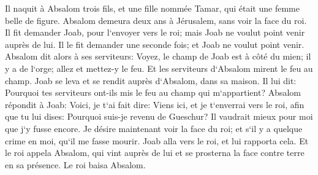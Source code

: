 \verse Il naquit à Absalom trois fils, et une fille nommée Tamar, qui était une femme belle de figure. 
\verse Absalom demeura deux ans à Jérusalem, sans voir la face du roi. 
\verse Il fit demander Joab, pour l`envoyer vers le roi; mais Joab ne voulut point venir auprès de lui. Il le fit demander une seconde fois; et Joab ne voulut point venir. 
\verse Absalom dit alors à ses serviteurs: Voyez, le champ de Joab est à côté du mien; il y a de l`orge; allez et mettez-y le feu. Et les serviteurs d`Absalom mirent le feu au champ. 
\verse Joab se leva et se rendit auprès d`Absalom, dans sa maison. Il lui dit: Pourquoi tes serviteurs ont-ils mis le feu au champ qui m`appartient? 
\verse Absalom répondit à Joab: Voici, je t`ai fait dire: Viens ici, et je t`enverrai vers le roi, afin que tu lui dises: Pourquoi suis-je revenu de Gueschur? Il vaudrait mieux pour moi que j`y fusse encore. Je désire maintenant voir la face du roi; et s`il y a quelque crime en moi, qu`il me fasse mourir. 
\verse Joab alla vers le roi, et lui rapporta cela. Et le roi appela Absalom, qui vint auprès de lui et se prosterna la face contre terre en sa présence. Le roi baisa Absalom. 

